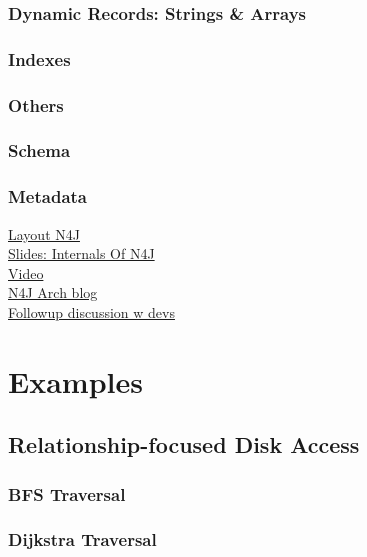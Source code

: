 \documentclass[a4paper,10pt]{article}
\begin{document}
    \subsubsection{Dynamic Records: Strings \& Arrays}\label{dynamic}
    
    \subsubsection{Indexes}
    
    \subsubsection{Others}
        \subsubsection{Schema}
        \subsubsection{Metadata}

    
    
    


\href{https://neo4j.com/developer/kb/understanding-data-on-disk/}{Layout N4J} \\
\href{https://www.slideshare.net/thobe/an-overview-of-neo4j-internals}{Slides: Internals Of N4J} \\
\href{https://skillsmatter.com/skillscasts/2968-neo4j-internals}{Video} \\
\href{http://key-value-stories.blogspot.com/2015/02/neo4j-architecture.html}{N4J Arch blog} \\
\href{https://groups.google.com/g/neo4j/c/cxClivwF94k}{Followup discussion w devs}


\section{Examples}
\subsection{Relationship-focused Disk Access}
    \subsubsection{BFS Traversal}

    \subsubsection{Dijkstra Traversal}
\end{document}
